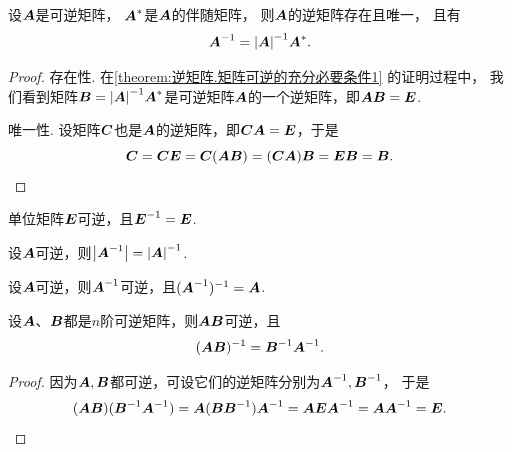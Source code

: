 \begin{property}\label{theorem:逆矩阵.逆矩阵的唯一性}
设\(\boldsymbol{A}\)是可逆矩阵，
\(\boldsymbol{A}^*\)是\(\boldsymbol{A}\)的伴随矩阵，
则\(\boldsymbol{A}\)的逆矩阵存在且唯一，
且有\begin{equation}
	\boldsymbol{A}^{-1} = \abs{\boldsymbol{A}}^{-1} \boldsymbol{A}^*.
\end{equation}
\begin{proof}
存在性.
在\cref{theorem:逆矩阵.矩阵可逆的充分必要条件1} 的证明过程中，
我们看到矩阵\(\boldsymbol{B}=\abs{\boldsymbol{A}}^{-1} \boldsymbol{A}^*\)是可逆矩阵\(\boldsymbol{A}\)的一个逆矩阵，即\(\boldsymbol{A}\boldsymbol{B}=\boldsymbol{E}\).

唯一性.
设矩阵\(\boldsymbol{C}\)也是\(\boldsymbol{A}\)的逆矩阵，即\(\boldsymbol{C}\boldsymbol{A}=\boldsymbol{E}\)，于是\begin{equation*}
	\boldsymbol{C}=\boldsymbol{C}\boldsymbol{E}=\boldsymbol{C}(\boldsymbol{A}\boldsymbol{B})=(\boldsymbol{C}\boldsymbol{A})\boldsymbol{B}=\boldsymbol{E}\boldsymbol{B}=\boldsymbol{B}.
	\qedhere
\end{equation*}
\end{proof}
\end{property}

\begin{property}\label{theorem:逆矩阵.单位矩阵可逆}
单位矩阵\(\boldsymbol{E}\)可逆，且\(\boldsymbol{E}^{-1}=\boldsymbol{E}\).
\end{property}

\begin{property}\label{theorem:逆矩阵.逆矩阵的行列式}
设\(\boldsymbol{A}\)可逆，则\(\abs{\boldsymbol{A}^{-1}} = \abs{\boldsymbol{A}}^{-1}\).
\end{property}

\begin{property}\label{theorem:逆矩阵.逆矩阵的逆}
设\(\boldsymbol{A}\)可逆，则\(\boldsymbol{A}^{-1}\)可逆，且\((\boldsymbol{A}^{-1})^{-1} = \boldsymbol{A}\).
\end{property}

\begin{property}\label{theorem:逆矩阵.矩阵乘积的逆1}
设\(\boldsymbol{A}\)、\(\boldsymbol{B}\)都是\(n\)阶可逆矩阵，则\(\boldsymbol{A}\boldsymbol{B}\)可逆，且\begin{equation}
	(\boldsymbol{A} \boldsymbol{B})^{-1} = \boldsymbol{B}^{-1} \boldsymbol{A}^{-1}.
\end{equation}
\begin{proof}
因为\(\boldsymbol{A},\boldsymbol{B}\)都可逆，可设它们的逆矩阵分别为\(\boldsymbol{A}^{-1},\boldsymbol{B}^{-1}\)，
于是\begin{equation*}
	(\boldsymbol{A}\boldsymbol{B})(\boldsymbol{B}^{-1}\boldsymbol{A}^{-1})
	= \boldsymbol{A}(\boldsymbol{B}\boldsymbol{B}^{-1})\boldsymbol{A}^{-1}
	= \boldsymbol{A}\boldsymbol{E}\boldsymbol{A}^{-1}
	= \boldsymbol{A}\boldsymbol{A}^{-1}
	= \boldsymbol{E}.
	\qedhere
\end{equation*}
\end{proof}
\end{property}

